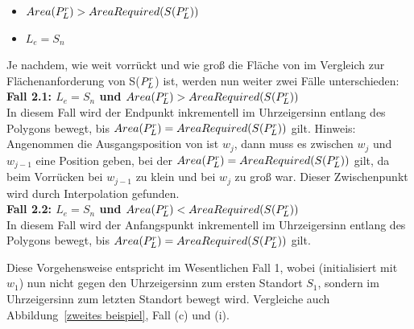 \documentclass[ngerman]{seminarbeitrag}
\begin{document}
\begin{itemize}
\item $Area(P_{L}^{r})>AreaRequired(S(P_{L}^{r}))$
\item $L_{e} = S_{n}$
\end{itemize}

Je nachdem, wie weit \Le vorrückt und wie groß die Fläche von \prl im Vergleich zur Flächenanforderung von S($P_{L}^{r}$) ist, werden nun weiter zwei Fälle unterschieden:\\

\textbf{Fall 2.1: $L_{e} = S_{n}$ und $Area(P_{L}^{r})>AreaRequired(S(P_{L}^{r}))$} \\
In diesem Fall wird der Endpunkt \Le inkrementell im Uhrzeigersinn entlang des Polygons bewegt, bis $Area(P_{L}^{r})=AreaRequired(S(P_{L}^{r}))$ gilt.
Hinweis: Angenommen die Ausgangsposition von \Le ist $w_{j}$, dann muss es zwischen $w_{j}$ und $w_{j-1}$ eine Position geben, bei der $Area(P_{L}^{r})=AreaRequired(S(P_{L}^{r}))$ gilt, da beim Vorrücken \ar{\mprl} bei $w_{j-1}$ zu klein und bei $w_{j}$ zu groß war. Dieser Zwischenpunkt wird durch Interpolation gefunden.\\

\textbf{Fall 2.2: $L_{e} = S_{n}$ und $Area(P_{L}^{r})<AreaRequired(S(P_{L}^{r}))$} \\
In diesem Fall wird der Anfangspunkt \ls inkrementell im Uhrzeigersinn entlang des Polygons bewegt, bis $Area(P_{L}^{r})=AreaRequired(S(P_{L}^{r}))$ gilt.

Diese Vorgehensweise entspricht im Wesentlichen Fall 1, wobei \ls (initialisiert mit $w_{1}$) nun nicht gegen den Uhrzeigersinn zum ersten Standort $S_{1}$, sondern im Uhrzeigersinn zum letzten Standort bewegt wird. Vergleiche auch Abbildung~\ref{zweites beispiel}, Fall (c) und (i).\\
\end{document}
